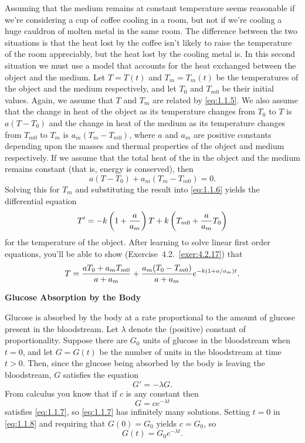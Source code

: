 \documentclass{ximera}
\begin{document}
Assuming that the medium remains at constant temperature seems
reasonable if we're considering a cup of coffee cooling in a room, but
 not if we're cooling a huge cauldron of molten
metal in the same room. The difference between the two situations is
that the heat lost by the coffee isn't likely to raise the
temperature of the room appreciably, but the heat lost by the
cooling metal is. In this second situation we must use a model that
accounts for the heat exchanged between the object and the medium. Let
$T=T(t)$ and $T_m=T_m(t)$ be the temperatures of the object and the
medium respectively, and let $T_0$ and $T_{m0}$ be their initial
values. Again, we assume that $T$ and $T_m$ are related by
\eqref{eq:1.1.5}. We also assume that the change in heat of
the object as its temperature changes from $T_0$ to $T$ is $a(T-T_0)$
and  the change in heat of the medium as its temperature changes
from $T_{m0}$ to $T_m$ is $a_m(T_m-T_{m0})$, where $a$ and $a_m$ are
positive constants depending upon the masses and thermal properties of
the object and medium respectively. If we assume that the total heat
of the in the object and the medium remains constant
(that is, energy is conserved), then
$$
a(T-T_0)+a_m(T_m-T_{m0})=0.
$$
Solving this for  $T_m$  and substituting the result into
\eqref{eq:1.1.6} yields the differential equation
$$
T'=-k\left(1+{a\over a_m}\right)T
+k\left(T_{m0}+{a\over a_m}T_0\right)
$$
for the temperature of the object.  After learning to solve linear
first order  equations, you'll be able to show
(Exercise~4.2.~\hspace*{-3pt}\ref{exer:4.2.17}) that
$$
T={aT_0+a_mT_{m0}\over
a+a_m}+{a_m(T_0-T_{m0})\over a+a_m}e^{-k(1+a/a_m)t}.
$$


\textbf{Glucose Absorption by the Body}

\noindent
Glucose is absorbed by
the body at a rate proportional to the amount of glucose present in
the bloodstream. Let $\lambda$ denote the (positive) constant of
proportionality. Suppose   there are $G_0$ units of glucose in
the bloodstream when $t=0$, and let $G=G(t)$ be the number of units in
the bloodstream at time $t>0$. Then, since the glucose being absorbed
by the body is leaving the bloodstream, $G$ satisfies the equation
\begin{equation} \label{eq:1.1.7}
G'=-\lambda G.
\end{equation}
From  calculus you know that if $c$ is any constant then
\begin{equation} \label{eq:1.1.8}
G=ce^{-\lambda t}
\end{equation}
satisfies \eqref{eq:1.1.7}, so \eqref{eq:1.1.7} has infinitely
many solutions.
 Setting $t=0$ in \eqref{eq:1.1.8} and requiring that
$G(0)=G_0$ yields $c=G_0$, so
$$
G(t)=G_0e^{-\lambda t}.
$$
\end{document}
